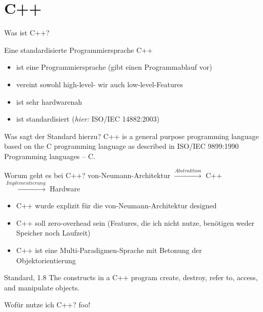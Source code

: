 \section{C++}


\begin{frame}{Was ist C++?}
	\begin{block}{Eine standardisierte Programmiersprache}
		C++
		\begin{itemize}
			\item ist eine Programmiersprache (gibt einen Programmablauf vor)
			\item vereint sowohl high-level- wir auch low-level-Features
			\item ist sehr hardwarenah
			\item ist standardisiert (\emph{hier:} ISO/IEC 14882:2003)
		\end{itemize}
	\end{block}
	
	\pause
	
	\begin{block}{Was sagt der Standard hierzu?}
		C++ is a general purpose programming language based on the C programming language as described in
		ISO/IEC 9899:1990 Programming languages – C.
	\end{block}
\end{frame}

\begin{frame}{Worum geht es bei C++?}
	von-Neumann-Architektur $\xrightarrow{Abstraktion}$ C++ $\xrightarrow{Implementierung}$ Hardware
	
	\begin{itemize}
		\item C++ wurde explizit für die von-Neumann-Architektur designed
		\item C++ soll zero-overhead sein (Features, die ich nicht nutze, benötigen weder Speicher noch Laufzeit)
		\item C++ ist eine Multi-Paradigmen-Sprache mit Betonung der Objektorientierung
	\end{itemize}
	
	\begin{block}{Standard, 1.8}
		The constructs in a C++ program create, destroy, refer to, access, and manipulate objects.
	\end{block}
\end{frame}

\begin{frame}{Wofür nutze ich C++?}
	foo!
\end{frame}
